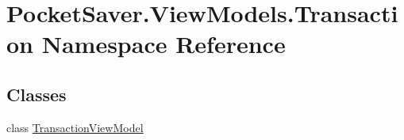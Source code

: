 \hypertarget{namespace_pocket_saver_1_1_view_models_1_1_transaction}{}\section{Pocket\+Saver.\+View\+Models.\+Transaction Namespace Reference}
\label{namespace_pocket_saver_1_1_view_models_1_1_transaction}
\subsection*{Classes}
\begin{DoxyCompactItemize}
\item 
class \hyperlink{class_pocket_saver_1_1_view_models_1_1_transaction_1_1_transaction_view_model}{Transaction\+View\+Model}
\end{DoxyCompactItemize}

